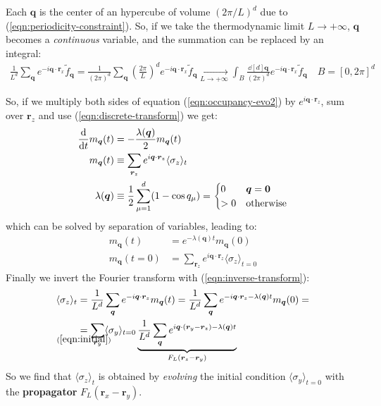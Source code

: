 \documentclass[../../main.tex]{subfiles}
\begin{document}
Each $\bm{q}$ is the center of an hypercube of volume $(2\pi/L)^d$ due to (\ref{eqn:periodicity-constraint}). So, if we take the thermodynamic limit $L \to +\infty$, $\bm{q}$ becomes a \textit{continuous} variable, and the summation can be replaced by an integral:
\begin{align*}
    \frac{1}{L^d} \sum_{\bm{q}} e^{-i \bm{q} \cdot \bm{r}_x} \tilde{f}_{\bm{q}} = \frac{1}{(2\pi)^d} \sum_{\bm{q}} \left(\frac{2\pi}{L} \right)^d e^{-i \bm{q}\cdot \bm{r}_x} \tilde{f}_{\bm{q}}  \xrightarrow[L \to +\infty]{}   \int_B \frac{\dd[d]{\bm{q}}}{(2\pi)^d}  e^{-i \bm{q} \cdot \bm{r}_x} \tilde{f}_{\bm{q}} \quad B = [0,2\pi]^d
\end{align*} 

\medskip

So, if we multiply both sides of equation (\ref{eqn:occupancy-evo2}) by $e^{i \bm{q} \cdot \bm{r}_z}$, sum over $\bm{r}_z$ and use (\ref{eqn:discrete-transform}) we get:
\begin{align}%
    \nonumber
    \dv{t} m_{\bm{q}}(t) &= -\frac{\lambda(\bm{q})}{2} m_{\bm{q}}(t) \\ \nonumber
    m_{\bm{q}}(t) &\equiv \sum_{\bm{r}_z} e^{i \bm{q} \cdot \bm{r}_z} \langle \sigma_z \rangle_t\\
    \lambda(\bm{q}) &\equiv \frac{1}{2} \sum_{\mu=1}^d (1- \cos q_\mu)  = \begin{cases}
        0 & \bm{q} = \bm{0}\\
        >0 & \text{otherwise}
    \end{cases} \label{eqn:lambda-q}
\end{align} %
which can be solved by separation of variables, leading to:
\begin{align}
    m_{\bm{q}}(t) &= e^{-\lambda(\bm{q}) t} m_{\bm{q}}(0)\\
    m_{\bm{q}}(t=0) &= \sum_{\bm{r}_z} e^{i \bm{q} \cdot \bm{r}_z} \langle \sigma_z \rangle_{t=0} \label{eqn:initial}
\end{align}
Finally we invert the Fourier transform with (\ref{eqn:inverse-transform}):
\begin{align}\nonumber
    \langle \sigma_z \rangle_t &= \frac{1}{L^d} \sum_{\bm{q}} e^{-i \bm{q} \cdot \bm{r}_z} m_{\bm{q}}(t) = \frac{1}{L^d} \sum_{\bm{q}} e^{-i \bm{q} \cdot \bm{r}_z - \lambda(\bm{q}) t} m_{\bm{q}}(0) =\\
    &\underset{\mathclap{(\ref{eqn:initial})}}{=}  \sum_{\bm{r}_y} \langle \sigma_y \rangle_{t=0} \underbrace{\frac{1}{L^d} \sum_{\bm{q}} e^{i \bm{q} \cdot (\bm{r}_y - \bm{r}_z) - \lambda(\bm{q})t}}_{F_L(\bm{r}_z - \bm{r}_y)} 
    \label{eqn:voter-propagator}
\end{align}
So we find that $\langle \sigma_z \rangle_t$ is obtained by \textit{evolving} the initial condition $\langle \sigma_y \rangle_{t=0}$ with the \textbf{propagator} $F_L(\bm{r}_x-\bm{r}_y)$. 
\end{document}
